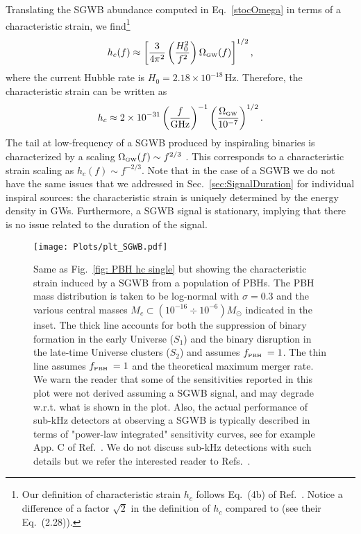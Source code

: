 \documentclass[11pt,a4paper]{article}
\begin{document}
Translating the SGWB abundance computed in Eq.~\eqref{stocOmega} in terms of a characteristic strain, we find\footnote{
Our definition of characteristic strain $h_c$ follows Eq.~(4b) of Ref.~\cite{Aggarwal:2020olq}.
Notice a difference of a factor $\sqrt{2}$ in the definition of $h_c$ compared to \cite{Ringwald:2020ist} (see their Eq.~(2.28)). }
\begin{equation}
\label{eq:StochasticStrain}
	h_c(f) \approx \left[ \frac{3}{4 \pi^2 } \left ( \frac{H_0^2}{f^2}\right) \Omega_\text{\tiny GW} (f) \right]^{1/2},
\end{equation}
where the current Hubble rate is $H_0 = 2.18 \times 10^{-18}\,$Hz. Therefore, the characteristic strain can be written as 
\begin{equation}\label{strain SGWB}
h_c \approx 2 \times 10^{-31} \left ( \frac{f}{{\rm GHz}} \right)^{-1} \left ( \frac{\Omega_\text{\tiny GW} }{10^{-7}} \right)^{1/2} .
\end{equation}
The tail at low-frequency of a SGWB produced by inspiraling binaries is characterized by a scaling $\Omega_\text{\tiny GW}(f) \sim f^{2/3}$ \cite{Moore:2014lga}. This corresponds to a characteristic strain scaling as $h_c (f) \sim f^{-2/3}$. Note that in the case of a SGWB we do not have the same issues that we addressed in Sec.~\ref{sec:SignalDuration} for individual inspiral sources: the characteristic strain is uniquely determined by the energy density in GWs. Furthermore, a SGWB signal is stationary, implying that there is no issue related to the duration of the signal.

\begin{figure}[t!]
\centering
\texttt{[image: Plots/plt\_SGWB.pdf]}
\caption{
Same as Fig.~\ref{fig: PBH hc single} but showing the characteristic strain induced by a 
SGWB from a population of PBHs.
The PBH mass distribution is taken to be log-normal with $\sigma = 0.3 $ and the various central masses $M_c\subset(10^{-16}\div 10^{-6})M_\odot$ indicated in the inset.
The thick line accounts for both the suppression of binary formation in the early Universe ($S_1$) and the binary disruption in the late-time Universe clusters ($S_2$) and assumes $f_\text{\tiny PBH }=1$.
The thin line assumes  $f_\text{\tiny PBH }=1$ and the theoretical maximum merger rate. 
We warn the reader that some of the sensitivities reported in this plot were not derived assuming a SGWB signal, and may degrade w.r.t. what is shown in the plot.
Also, the actual performance of sub-kHz detectors at observing a SGWB is typically described in terms of "power-law integrated" sensitivity curves, see for example App. C of Ref.~\cite{Bavera:2021wmw}.
We do not discuss sub-kHz detections with such details but we refer the interested reader to Refs.~\cite{DeLuca:2021hde,Pujolas:2021yaw}. 
}\label{fig: PBH hc SGWB}
\end{figure}
\end{document}
